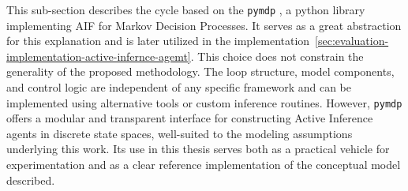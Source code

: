 This sub-section describes the cycle based on the \texttt{pymdp} \cite{heins_pymdp_2022}, a python library implementing AIF for Markov Decision Processes. It serves as a great abstraction for this explanation and is later utilized in the implementation~\ref{sec:evaluation-implementation-active-infernce-agemt}. This choice does not constrain the generality of the proposed methodology. The loop structure, model components, and control logic are independent of any specific framework and can be implemented using alternative tools or custom inference routines. However, \texttt{pymdp} offers a modular and transparent interface for constructing Active Inference agents in discrete state spaces, well-suited to the modeling assumptions underlying this work. Its use in this thesis serves both as a practical vehicle for experimentation and as a clear reference implementation of the conceptual model described. 

